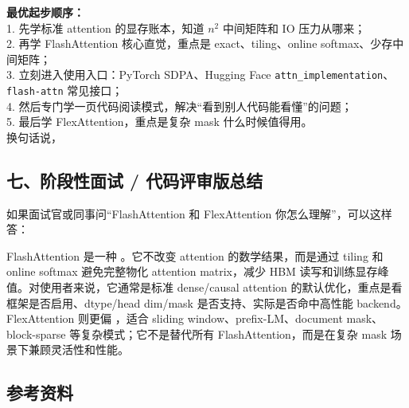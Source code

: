 \begin{summarybox}
\textbf{最优起步顺序：}\\
1. 先学标准 attention 的显存账本，知道 $n^2$ 中间矩阵和 IO 压力从哪来；\\
2. 再学 FlashAttention 核心直觉，重点是 exact、tiling、online softmax、少存中间矩阵；\\
3. 立刻进入使用入口：PyTorch SDPA、Hugging Face \texttt{attn\_implementation}、\texttt{flash-attn} 常见接口；\\
4. 然后专门学一页代码阅读模式，解决“看到别人代码能看懂”的问题；\\
5. 最后学 FlexAttention，重点是复杂 mask 什么时候值得用。\\
换句话说，
\end{summarybox}

\subsection{七、阶段性面试 / 代码评审版总结}

如果面试官或同事问“FlashAttention 和 FlexAttention 你怎么理解”，可以这样答：

\begin{conceptbox}
FlashAttention 是一种 。它不改变 attention 的数学结果，而是通过 tiling 和 online softmax 避免完整物化 attention matrix，减少 HBM 读写和训练显存峰值。对使用者来说，它通常是标准 dense/causal attention 的默认优化，重点是看框架是否启用、dtype/head dim/mask 是否支持、实际是否命中高性能 backend。FlexAttention 则更偏 ，适合 sliding window、prefix-LM、document mask、block-sparse 等复杂模式；它不是替代所有 FlashAttention，而是在复杂 mask 场景下兼顾灵活性和性能。
\end{conceptbox}

\subsection{参考资料}

